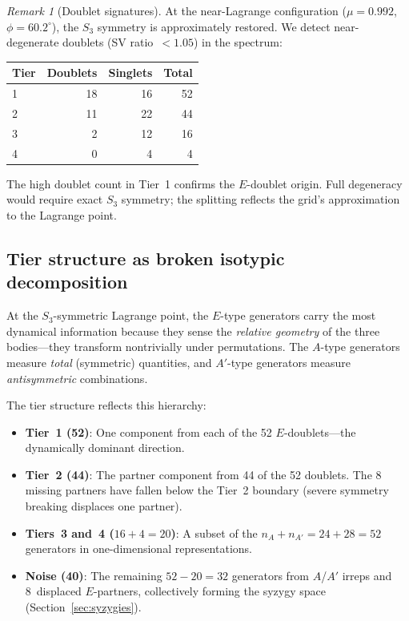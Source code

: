 \documentclass[11pt,a4paper]{article}
\theoremstyle{remark}
\newtheorem{remark}[theorem]{Remark}
\newcommand{\SG}{S_3}
\begin{document}
\begin{remark}[Doublet signatures]
At the near-Lagrange configuration
($\mu = 0.992$, $\phi = 60.2^\circ$), the $\SG$ symmetry
is approximately restored.  We detect near-degenerate
doublets (SV ratio~$< 1.05$) in the spectrum:
\begin{center}
\begin{tabular}{@{}lrrr@{}}
\toprule
Tier & Doublets & Singlets & Total \\
\midrule
1 & 18 & 16 & 52 \\
2 & 11 & 22 & 44 \\
3 & 2 & 12 & 16 \\
4 & 0 & 4 & 4 \\
\bottomrule
\end{tabular}
\end{center}
The high doublet count in Tier~1 confirms the
$E$-doublet origin.  Full degeneracy would require exact
$\SG$ symmetry; the splitting reflects the grid's
approximation to the Lagrange point.
\end{remark}

\subsection{Tier structure as broken isotypic decomposition}

At the $\SG$-symmetric Lagrange point, the $E$-type
generators carry the most dynamical information because
they sense the \emph{relative geometry} of the three
bodies---they transform nontrivially under permutations.
The $A$-type generators measure \emph{total} (symmetric)
quantities, and $A'$-type generators measure
\emph{antisymmetric} combinations.

The tier structure reflects this hierarchy:
\begin{itemize}[nosep]
  \item \textbf{Tier~1 (52)}: One component from each of
    the 52 $E$-doublets---the dynamically dominant
    direction.
  \item \textbf{Tier~2 (44)}: The partner component from
    44 of the 52 doublets.  The 8 missing partners have
    fallen below the Tier~2 boundary (severe symmetry
    breaking displaces one partner).
  \item \textbf{Tiers~3 and~4 ($16 + 4 = 20$)}: A subset
    of the $n_A + n_{A'} = 24 + 28 = 52$ generators in
    one-dimensional representations.
  \item \textbf{Noise (40)}: The remaining
    $52 - 20 = 32$ generators from $A$/$A'$ irreps and
    8~displaced $E$-partners, collectively forming the
    syzygy space (Section~\ref{sec:syzygies}).
\end{itemize}
\end{document}
